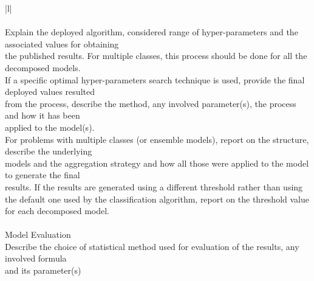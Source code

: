 \begin{table}[ht]
\begin{adjustwidth}{-0.0in}{-0.0in}
\begin{tabular}{|l|}
                \\
                \\
                \textbullet Explain the deployed algorithm, considered range of hyper-parameters and the associated values for 
                obtaining \\the published results. For multiple classes, this process should be done for all the 
                decomposed models.\\
                \textbullet If a specific optimal hyper-parameters search technique is used, provide the final deployed values 
                resulted\\ from the process, describe the method, any involved parameter(s), the process and 
                how it has been \\ applied to the model(s).\\
                \textbullet For problems with multiple classes (or ensemble models), report on the structure, describe the 
                underlying\\ models and the aggregation strategy and how all those were applied to the model to generate 
                the final\\ results. If the results are generated using a different threshold rather 
                than using\\ the default one used by the classification algorithm, report on the threshold value for each 
                decomposed model.\\
                \\
            \hline
             {Model Evaluation}\\
            \hline
                \textbullet Describe the choice of statistical method used for evaluation of the results, any involved formula 
                \\ and its parameter(s)\\
                \\
                \\
            \hline

        \end{tabular}
    \end{adjustwidth}    
\end{table}